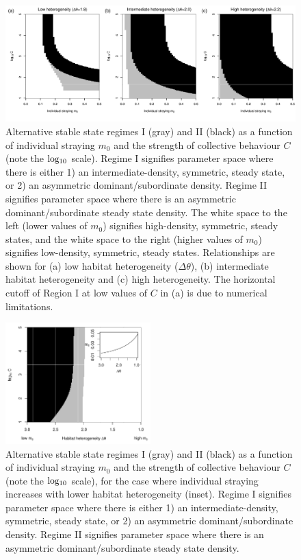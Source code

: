 \documentclass{revtex4}
\begin{document}
\begin{figure}
  \captionsetup{justification=raggedright,
singlelinecheck=false
}
\centering
\includegraphics[width=1\textwidth]{fig_hysteresis_ddm.pdf}
\caption{
Alternative stable state regimes I (gray) and II (black) as a function of individual straying $m_0$ and the strength of collective behaviour $C$ (note the $\rm log_{10}$ scale).
Regime I signifies parameter space where there is either 1) an intermediate-density, symmetric, steady state, or 2) an asymmetric dominant/subordinate density.
Regime II signifies parameter space where there is an asymmetric dominant/subordinate steady state density.
The white space to the left (lower values of $m_0$) signifies high-density, symmetric, steady states, and the white space to the right (higher values of $m_0$) signifies low-density, symmetric, steady states.
Relationships are shown for (a) low habitat heterogeneity ($\Delta\theta$), (b) intermediate habitat heterogeneity and (c) high heterogeneity.
The horizontal cutoff of Region I at low values of $C$ in (a) is due to numerical limitations. 
} \label{fig:bifurcationsddm}
\end{figure}


\begin{figure}
  \captionsetup{justification=raggedright,
singlelinecheck=false
}
\centering
\includegraphics[width=0.5\textwidth]{fig_hysteresis_ddm_mtheta.pdf}
\caption{
Alternative stable state regimes I (gray) and II (black) as a function of individual straying $m_0$ and the strength of collective behaviour $C$ (note the $\rm log_{10}$ scale), for the case where individual straying increases with lower habitat heterogeneity (inset).
Regime I signifies parameter space where there is either 1) an intermediate-density, symmetric, steady state, or 2) an asymmetric dominant/subordinate density.
Regime II signifies parameter space where there is an asymmetric dominant/subordinate steady state density.
} \label{fig:mtheta}
\end{figure}
\end{document}
